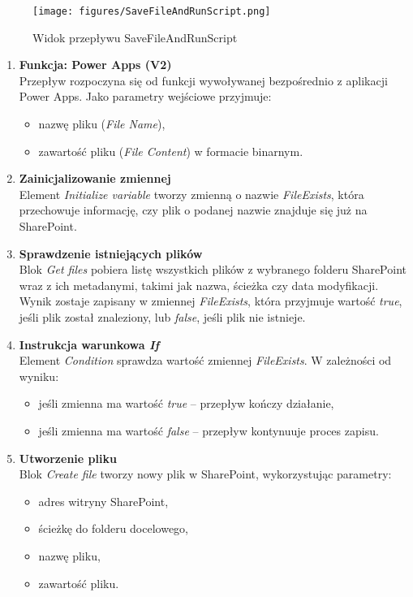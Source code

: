 \begin{figure}[t]
    \centering
    \texttt{[image: figures/SaveFileAndRunScript.png]}
    \caption{Widok przepływu SaveFileAndRunScript}
    \label{fig:savefileandrunscript}
\end{figure}


\begin{enumerate}
    \item \textbf{Funkcja: Power Apps (V2)} \\
    Przepływ rozpoczyna się od funkcji wywoływanej bezpośrednio z aplikacji Power Apps. Jako parametry wejściowe przyjmuje:
    \begin{itemize}
        \item nazwę pliku (\textit{File Name}),
        \item zawartość pliku (\textit{File Content}) w formacie binarnym.
    \end{itemize}

    \item \textbf{Zainicjalizowanie zmiennej} \\
    Element \textit{Initialize variable} tworzy zmienną o nazwie \textit{FileExists}, która przechowuje informację, czy plik o podanej nazwie znajduje się już na SharePoint.

    \item \textbf{Sprawdzenie istniejących plików} \\
    Blok \textit{Get files} pobiera listę wszystkich plików z wybranego folderu SharePoint wraz z ich metadanymi, takimi jak nazwa, ścieżka czy data modyfikacji. Wynik zostaje zapisany w zmiennej \textit{FileExists}, która przyjmuje wartość \textit{true}, jeśli plik został znaleziony, lub \textit{false}, jeśli plik nie istnieje.

    \item \textbf{Instrukcja warunkowa \emph{If}} \\
    Element \textit{Condition} sprawdza wartość zmiennej \textit{FileExists}. W zależności od wyniku:
    \begin{itemize}
        \item jeśli zmienna ma wartość \textit{true} -- przepływ kończy działanie,
        \item jeśli zmienna ma wartość \textit{false} -- przepływ kontynuuje proces zapisu.
    \end{itemize}

    \item \textbf{Utworzenie pliku} \\
    Blok \textit{Create file} tworzy nowy plik w SharePoint, wykorzystując parametry:
    \begin{itemize}
        \item adres witryny SharePoint,
        \item ścieżkę do folderu docelowego,
        \item nazwę pliku,
        \item zawartość pliku.
    \end{itemize}


\end{enumerate}
